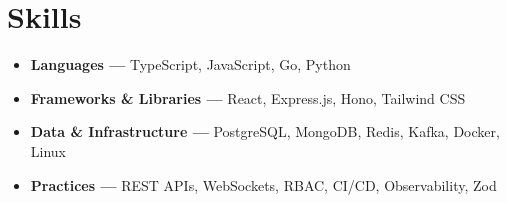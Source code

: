 \section{Skills}
\begin{itemize}[leftmargin=0.15in, label={}, itemsep=4pt, topsep=4pt]
  \small
  \item \textbf{Languages ---} TypeScript, JavaScript, Go, Python
  \item \textbf{Frameworks \& Libraries ---} React, Express.js, Hono, Tailwind CSS
  \item \textbf{Data \& Infrastructure ---} PostgreSQL, MongoDB, Redis, Kafka, Docker, Linux
  \item \textbf{Practices ---} REST APIs, WebSockets, RBAC, CI/CD, Observability, Zod
\end{itemize}